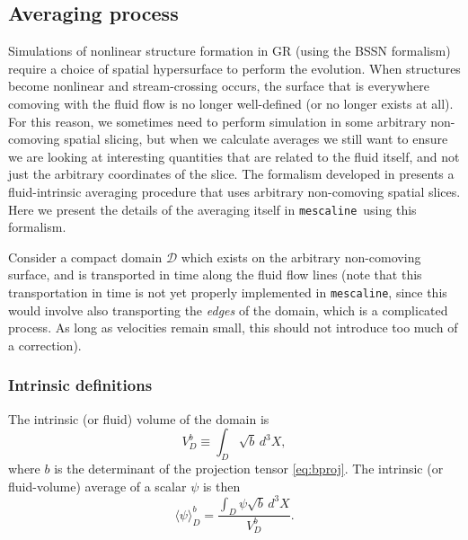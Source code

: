 \documentclass[a4paper]{article}
\newcommand{\mesc}{\texttt{mescaline}}
\begin{document}
\subsection{Averaging process}

Simulations of nonlinear structure formation in GR (using the BSSN formalism) require a choice of spatial hypersurface to perform the evolution. When structures become nonlinear and stream-crossing occurs, the surface that is everywhere comoving with the fluid flow is no longer well-defined (or no longer exists at all). For this reason, we sometimes need to perform simulation in some arbitrary non-comoving spatial slicing, but when we calculate averages we still want to ensure we are looking at interesting quantities that are related to the fluid itself, and not just the arbitrary coordinates of the slice. The formalism developed in \citet{buchert2019} presents a fluid-intrinsic averaging procedure that uses arbitrary non-comoving spatial slices. Here we present the details of the averaging itself in \mesc\, using this formalism. 

Consider a compact domain $\mathcal{D}$ which exists on the arbitrary non-comoving surface, and is transported in time along the fluid flow lines (note that this transportation in time is not yet properly implemented in \mesc, since this would involve also transporting the \textit{edges} of the domain, which is a complicated process. As long as velocities remain small, this should not introduce too much of a correction). 

\subsubsection{Intrinsic definitions}

The intrinsic (or fluid) volume of the domain is
\begin{equation}
	V^b_D \equiv \int_D \sqrt{b}\, d^3X,
\end{equation}
where $b$ is the determinant of the projection tensor \eqref{eq:bproj}. The intrinsic (or fluid-volume) average of a scalar $\psi$ is then
\begin{equation} \label{eq:avgb}
	\langle\psi\rangle^b_D = \frac{\int_D \psi \sqrt{b}\, d^3 X}{V^b_D}.
\end{equation}
\end{document}
